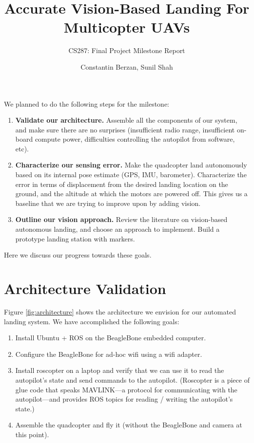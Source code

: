 \documentclass[10pt, twocolumn]{scrartcl} %
\title{Accurate Vision-Based Landing For Multicopter UAVs}
\subtitle{CS287: Final Project Milestone Report}
\author{Constantin Berzan, Sunil Shah}
\date{}
\begin{document}
\maketitle
We planned to do the following steps for the milestone:

\begin{enumerate}

\item {\bf Validate our architecture.} Assemble all the components of our
system, and make sure there are no surprises (insufficient radio range,
insufficient on-board compute power, difficulties controlling the autopilot
from software, etc).

\item {\bf Characterize our sensing error.} Make the quadcopter land
autonomously based on its internal pose estimate (GPS, IMU, barometer).
Characterize the error in terms of displacement from the desired landing
location on the ground, and the altitude at which the motors are powered off.
This gives us a baseline that we are trying to improve upon by adding vision.

\item {\bf Outline our vision approach.} Review the literature on vision-based
autonomous landing, and choose an approach to implement. Build a prototype
landing station with markers.

\end{enumerate}

Here we discuss our progress towards these goals.

\section{Architecture Validation}

Figure \ref{fig:architecture} shows the architecture we envision for our
automated landing system. We have accomplished the following goals:

\begin{enumerate}
\item Install Ubuntu + ROS on the BeagleBone embedded computer.
\item Configure the BeagleBone for ad-hoc wifi using a wifi adapter.
\item Install roscopter on a laptop and verify that we can use it to read the
      autopilot's state and send commands to the autopilot. (Roscopter is a
      piece of glue code that speaks MAVLINK---a protocol for communicating
      with the autopilot---and provides ROS topics for reading / writing the
      autopilot's state.)
\item Assemble the quadcopter and fly it (without the BeagleBone and camera at
      this point).
\end{enumerate}
\end{document}
